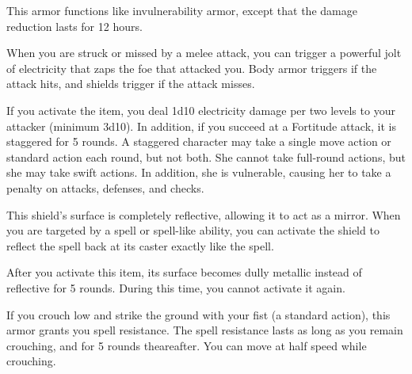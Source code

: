 
 This armor functions like invulnerability armor, except that the damage reduction lasts for 12 hours.


 When you are struck or missed by a melee attack, you can trigger a powerful jolt of electricity that zaps the foe that attacked you. Body armor triggers if the attack hits, and shields trigger if the attack misses.

If you activate the item, you deal 1d10 electricity damage per two levels to your attacker (minimum 3d10). In addition, if you succeed at a Fortitude attack, it is staggered for 5 rounds. A staggered character may take a single move action or standard action each round, but not both. She cannot take full-round actions, but she may take swift actions. In addition, she is vulnerable, causing her to take a  penalty on attacks, defenses, and checks.


 This shield's surface is completely reflective, allowing it to act as a mirror. When you are targeted by a spell or spell-like ability, you can activate the shield to reflect the spell back at its caster exactly like the  spell.

After you activate this item, its surface becomes dully metallic instead of reflective for 5 rounds. During this time, you cannot activate it again.


 If you crouch low and strike the ground with your fist (a standard action), this armor grants you spell resistance. The spell resistance lasts as long as you remain crouching, and for 5 rounds theareafter. You can move at half speed while crouching.

